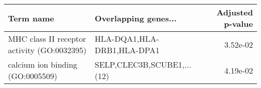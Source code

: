 \begin{tabular}{llr}
\toprule
                                  Term name &       Overlapping genes... &  Adjusted p-value \\
\midrule
MHC class II receptor activity (GO:0032395) & HLA-DQA1,HLA-DRB1,HLA-DPA1 &          3.52e-02 \\
           calcium ion binding (GO:0005509) & SELP,CLEC3B,SCUBE1,...(12) &          4.19e-02 \\
\bottomrule
\end{tabular}
